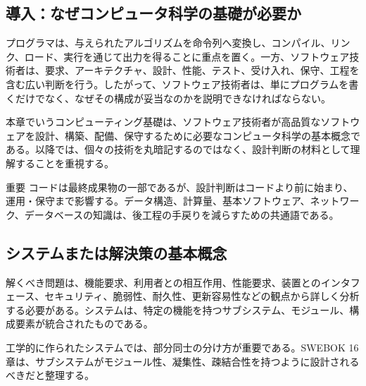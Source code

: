 \documentclass[a4paper,11pt]{ltjsarticle}
\numberwithin{figure}{section}
\numberwithin{table}{section}
\begin{document}
\subsection{導入：なぜコンピュータ科学の基礎が必要か}

プログラマは、与えられたアルゴリズムを命令列へ変換し、コンパイル、リンク、ロード、実行を通じて出力を得ることに重点を置く。一方、ソフトウェア技術者は、要求、アーキテクチャ、設計、性能、テスト、受け入れ、保守、工程を含む広い判断を行う。したがって、ソフトウェア技術者は、単にプログラムを書くだけでなく、なぜその構成が妥当なのかを説明できなければならない。

本章でいうコンピューティング基礎は、ソフトウェア技術者が高品質なソフトウェアを設計、構築、配備、保守するために必要なコンピュータ科学の基本概念である。以降では、個々の技術を丸暗記するのではなく、設計判断の材料として理解することを重視する。

\begin{pointbox}{重要}
コードは最終成果物の一部であるが、設計判断はコードより前に始まり、運用・保守まで影響する。データ構造、計算量、基本ソフトウェア、ネットワーク、データベースの知識は、後工程の手戻りを減らすための共通語である。

\end{pointbox}

\subsection{システムまたは解決策の基本概念}

解くべき問題は、機能要求、利用者との相互作用、性能要求、装置とのインタフェース、セキュリティ、脆弱性、耐久性、更新容易性などの観点から詳しく分析する必要がある。システムは、特定の機能を持つサブシステム、モジュール、構成要素が統合されたものである。

工学的に作られたシステムでは、部分同士の分け方が重要である。SWEBOK 16章は、サブシステムがモジュール性、凝集性、疎結合性を持つように設計されるべきだと整理する。
\end{document}
